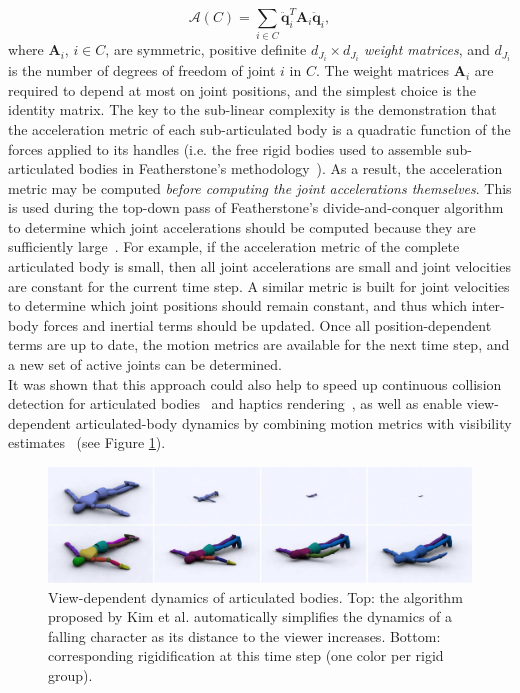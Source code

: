 \[\mathcal{A}(C)=\sum_{i\in C}\mathbf{\ddot{q}}_i^T\mathbf{A}_i\mathbf{\ddot{q}}_i,\] where $\mathbf{A}_i$, $i\in C$, are symmetric, positive definite $d_{J_i}\times d_{J_i}$ \emph{weight matrices}, and $d_{J_i}$ is
the number of degrees of freedom of joint $i$ in $C$. The weight matrices $\mathbf{A}_i$ are required to depend at most on joint positions, and the simplest choice is the identity
matrix. The key to the sub-linear complexity is the demonstration that the acceleration metric of each sub-articulated body is a quadratic function of the forces applied to its handles (i.e. the free rigid bodies used to assemble sub-articulated bodies in Featherstone's methodology~\cite{Redon2005}). As a result, the acceleration metric may be computed \emph{before computing the joint accelerations themselves}. This is used during the top-down pass of Featherstone's divide-and-conquer algorithm to determine which joint accelerations should be computed because they are sufficiently large~\cite{Redon2005}. For example, if the acceleration metric of the complete articulated body is small, then all joint accelerations are small and joint velocities are constant for the current time step. A similar metric is built for joint velocities to determine which joint positions should remain constant, and thus which inter-body forces and inertial terms should be updated. Once all position-dependent terms are up to date, the motion metrics are available for the next time step, and a new set of active joints can be determined.
\\
It was shown that this approach could also help to speed up continuous collision detection for articulated bodies~\cite{Kim2008Collision} and haptics rendering~\cite{Morin2007}, as well as enable view-dependent articulated-body dynamics by combining motion metrics with visibility estimates~\cite{Kim2008View} (see Figure \ref{fig:ViewDependentArticulatedBodies}).
\begin{figure}[!h]
	\includegraphics[width=\linewidth]{./images/starAdaptivity-cgf2016/WMComparisonNoLabels.png}
	\caption[STAR adaptivity: Articulated rigid body freezing]{\label{fig:ViewDependentArticulatedBodies}View-dependent dynamics of articulated bodies. Top: the algorithm proposed by Kim et al. \cite{Kim2008Collision} automatically simplifies the dynamics of a falling character as its distance to the viewer increases. Bottom: corresponding rigidification at this time step (one color per rigid group).}
\end{figure}
